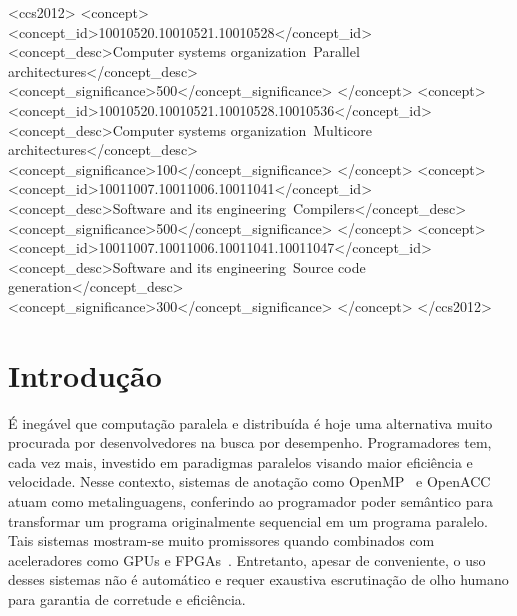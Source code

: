 \documentclass[sigconf]{acmart}
\begin{document}
\begin{CCSXML}
<ccs2012>
<concept>
<concept_id>10010520.10010521.10010528</concept_id>
<concept_desc>Computer systems organization~Parallel architectures</concept_desc>
<concept_significance>500</concept_significance>
</concept>
<concept>
<concept_id>10010520.10010521.10010528.10010536</concept_id>
<concept_desc>Computer systems organization~Multicore architectures</concept_desc>
<concept_significance>100</concept_significance>
</concept>
<concept>
<concept_id>10011007.10011006.10011041</concept_id>
<concept_desc>Software and its engineering~Compilers</concept_desc>
<concept_significance>500</concept_significance>
</concept>
<concept>
<concept_id>10011007.10011006.10011041.10011047</concept_id>
<concept_desc>Software and its engineering~Source code generation</concept_desc>
<concept_significance>300</concept_significance>
</concept>
</ccs2012>
\end{CCSXML}





\maketitle

\section{Introdu\c{c}\~{a}o}
\label{sec:intro}

É inegável que computação paralela e distribuída é hoje uma alternativa muito procurada por 
desenvolvedores na busca por desempenho. Programadores tem, cada vez mais, investido
em paradigmas paralelos visando maior eficiência e velocidade. Nesse contexto, sistemas de
anotação como OpenMP~\cite{JaegerCP15} e
OpenACC~\cite{OpenACC20} atuam como metalinguagens, conferindo ao programador
poder semântico para transformar um programa originalmente sequencial
em um programa paralelo. Tais sistemas mostram-se muito promissores quando
combinados com aceleradores como GPUs e FPGAs~\cite{Mendonca17,Poesia17}.
Entretanto, apesar de conveniente, o uso desses sistemas não é automático e
requer exaustiva escrutinação de olho humano para garantia de corretude e eficiência.
\end{document}
